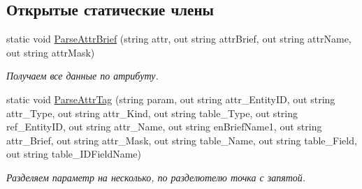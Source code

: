 \subsection*{Открытые статические члены}
\begin{DoxyCompactItemize}
\item 
static void \mbox{\hyperlink{class_f_b_a_1_1_comp_attr_tree_f_b_a_aaf4efa0f70cc785a1bebba99ed2ba14b}{Parse\+Attr\+Brief}} (string attr, out string attr\+Brief, out string attr\+Name, out string attr\+Mask)
\begin{DoxyCompactList}\small\item\em Получаем все данные по атрибуту. \end{DoxyCompactList}\item 
static void \mbox{\hyperlink{class_f_b_a_1_1_comp_attr_tree_f_b_a_a29c68518c0743ea14092fbe14221877f}{Parse\+Attr\+Tag}} (string param, out string attr\+\_\+\+Entity\+ID, out string attr\+\_\+\+Type, out string attr\+\_\+\+Kind, out string table\+\_\+\+Type, out string ref\+\_\+\+Entity\+ID, out string attr\+\_\+\+Name, out string en\+Brief\+Name1, out string attr\+\_\+\+Brief, out string attr\+\_\+\+Mask, out string table\+\_\+\+Name, out string table\+\_\+\+Field, out string table\+\_\+\+I\+D\+Field\+Name)
\begin{DoxyCompactList}\small\item\em Разделяем параметр на несколько, по разделютелю точка с запятой. \end{DoxyCompactList}\end{DoxyCompactItemize}
